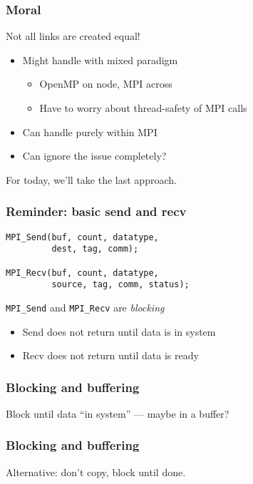 \documentclass{beamer}
\begin{document}
\begin{frame}
  \frametitle{Moral}

  Not all links are created equal!
  \begin{itemize}
  \item Might handle with mixed paradigm 
    \begin{itemize}
    \item OpenMP on node, MPI across
    \item Have to worry about thread-safety of MPI calls
    \end{itemize}
  \item Can handle purely within MPI
  \item Can ignore the issue completely?
  \end{itemize}
  For today, we'll take the last approach.

\end{frame}


\begin{frame}[fragile]
  \frametitle{Reminder: basic send and recv}

\begin{verbatim}
MPI_Send(buf, count, datatype, 
         dest, tag, comm);

MPI_Recv(buf, count, datatype,
         source, tag, comm, status);

\end{verbatim}

{\tt MPI\_Send} and {\tt MPI\_Recv} are {\em blocking}
\begin{itemize}
\item Send does not return until data is in system
\item Recv does not return until data is ready
\end{itemize}

\end{frame}


\begin{frame}
  \frametitle{Blocking and buffering}

  \begin{center}
    
  \end{center}  
  Block until data ``in system'' --- maybe in a buffer?

\end{frame}


\begin{frame}
  \frametitle{Blocking and buffering}

  \begin{center}
    
  \end{center}  
  Alternative: don't copy, block until done.

\end{frame}
\end{document}
